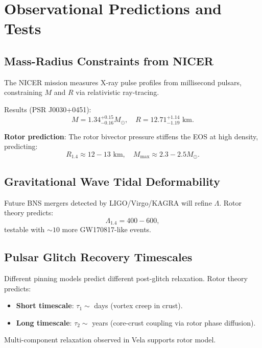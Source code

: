 \documentclass[12pt,a4paper]{article}
\theoremstyle{definition}
\theoremstyle{remark}
\begin{document}
\section{Observational Predictions and Tests}

\subsection{Mass-Radius Constraints from NICER}

The NICER mission measures X-ray pulse profiles from millisecond pulsars, constraining $M$ and $R$ via relativistic ray-tracing.

Results (PSR J0030+0451):
\begin{equation}
M = 1.34^{+0.15}_{-0.16} M_\odot, \quad R = 12.71^{+1.14}_{-1.19} \text{ km}.
\end{equation}

\textbf{Rotor prediction}: The rotor bivector pressure stiffens the EOS at high density, predicting:
\begin{equation}
R_{1.4} \approx 12-13 \text{ km}, \quad M_{\text{max}} \approx 2.3-2.5 M_\odot.
\end{equation}

\subsection{Gravitational Wave Tidal Deformability}

Future BNS mergers detected by LIGO/Virgo/KAGRA will refine $\Lambda$. Rotor theory predicts:
\begin{equation}
\Lambda_{1.4} = 400-600,
\end{equation}
testable with $\sim 10$ more GW170817-like events.

\subsection{Pulsar Glitch Recovery Timescales}

Different pinning models predict different post-glitch relaxation. Rotor theory predicts:
\begin{itemize}
\item \textbf{Short timescale}: $\tau_1 \sim$ days (vortex creep in crust).
\item \textbf{Long timescale}: $\tau_2 \sim$ years (core-crust coupling via rotor phase diffusion).
\end{itemize}

Multi-component relaxation observed in Vela supports rotor model.
\end{document}
